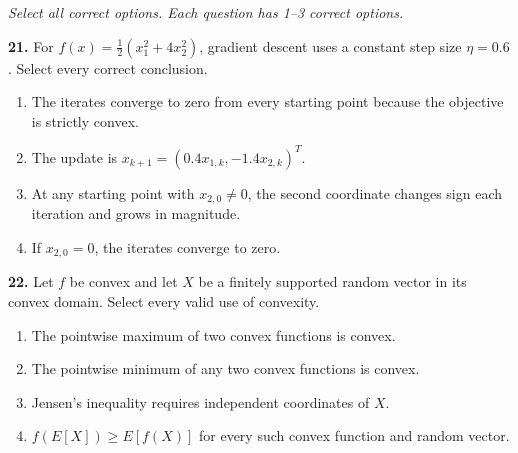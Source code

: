 \documentclass[11pt,a4paper]{article}
\begin{document}
\textit{Select all correct options. Each question has 1--3 correct options.}\par
\par\noindent\begin{minipage}{\linewidth}
\textbf{21.} For \(f(x)=\tfrac12(x_1^2+4x_2^2)\), gradient descent uses a constant step size \(\eta=0.6\). Select every correct conclusion.
\begin{enumerate}[label=(\Alph*),leftmargin=8mm,itemsep=2pt,topsep=2pt]
\item The iterates converge to zero from every starting point because the objective is strictly convex.
\item The update is \(x_{k+1}=(0.4x_{1,k},-1.4x_{2,k})^T\).
\item At any starting point with \(x_{2,0}\ne0\), the second coordinate changes sign each iteration and grows in magnitude.
\item If \(x_{2,0}=0\), the iterates converge to zero.
\end{enumerate}

\end{minipage}\par\vspace{3mm}
\par\noindent\begin{minipage}{\linewidth}
\textbf{22.} Let \(f\) be convex and let \(X\) be a finitely supported random vector in its convex domain. Select every valid use of convexity.
\begin{enumerate}[label=(\Alph*),leftmargin=8mm,itemsep=2pt,topsep=2pt]
\item The pointwise maximum of two convex functions is convex.
\item The pointwise minimum of any two convex functions is convex.
\item Jensen's inequality requires independent coordinates of \(X\).
\item \(f(E[X])\ge E[f(X)]\) for every such convex function and random vector.
\end{enumerate}

\end{minipage}\par\vspace{3mm}
\end{document}
